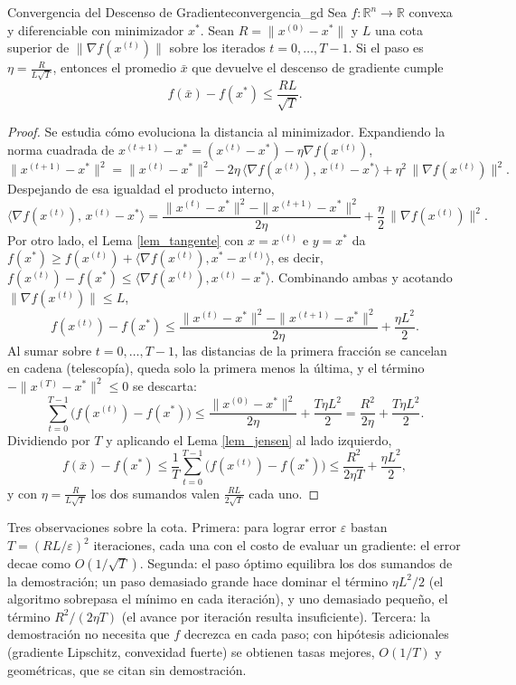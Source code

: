 \documentclass[11pt, a4paper]{article}
\begin{document}
\begin{teorema}{Convergencia del Descenso de Gradiente}{convergencia_gd}
Sea $f: \mathbb{R}^n \to \mathbb{R}$ convexa y diferenciable con minimizador $x^*$. Sean $R = \|x^{(0)} - x^*\|$ y $L$ una cota superior de $\|\nabla f(x^{(t)})\|$ sobre los iterados $t = 0, \dots, T-1$. Si el paso es $\eta = \frac{R}{L \sqrt{T}}$, entonces el promedio $\bar{x}$ que devuelve el descenso de gradiente cumple
\[
f(\bar{x}) - f(x^*) \le \frac{R L}{\sqrt{T}}.
\]
\end{teorema}

\begin{proof}
Se estudia cómo evoluciona la distancia al minimizador. Expandiendo la norma cuadrada de $x^{(t+1)} - x^* = (x^{(t)} - x^*) - \eta \nabla f(x^{(t)})$,
\[
\|x^{(t+1)} - x^*\|^2 = \|x^{(t)} - x^*\|^2 - 2 \eta \, \langle \nabla f(x^{(t)}), \, x^{(t)} - x^* \rangle + \eta^2 \, \|\nabla f(x^{(t)})\|^2.
\]
Despejando de esa igualdad el producto interno,
\[
\langle \nabla f(x^{(t)}), \, x^{(t)} - x^* \rangle
= \frac{\|x^{(t)} - x^*\|^2 - \|x^{(t+1)} - x^*\|^2}{2 \eta} + \frac{\eta}{2} \, \|\nabla f(x^{(t)})\|^2.
\]
Por otro lado, el Lema \ref{lem_tangente} con $x = x^{(t)}$ e $y = x^*$ da $f(x^*) \ge f(x^{(t)}) + \langle \nabla f(x^{(t)}), x^* - x^{(t)} \rangle$, es decir, $f(x^{(t)}) - f(x^*) \le \langle \nabla f(x^{(t)}), x^{(t)} - x^* \rangle$. Combinando ambas y acotando $\|\nabla f(x^{(t)})\| \le L$,
\[
f(x^{(t)}) - f(x^*) \le \frac{\|x^{(t)} - x^*\|^2 - \|x^{(t+1)} - x^*\|^2}{2 \eta} + \frac{\eta L^2}{2}.
\]
Al sumar sobre $t = 0, \dots, T-1$, las distancias de la primera fracción se cancelan en cadena (telescopía), queda solo la primera menos la última, y el término $-\|x^{(T)} - x^*\|^2 \le 0$ se descarta:
\[
\sum_{t=0}^{T-1} \big( f(x^{(t)}) - f(x^*) \big) \le \frac{\|x^{(0)} - x^*\|^2}{2 \eta} + \frac{T \eta L^2}{2} = \frac{R^2}{2 \eta} + \frac{T \eta L^2}{2}.
\]
Dividiendo por $T$ y aplicando el Lema \ref{lem_jensen} al lado izquierdo,
\[
f(\bar{x}) - f(x^*) \le \frac{1}{T} \sum_{t=0}^{T-1} \big( f(x^{(t)}) - f(x^*) \big) \le \frac{R^2}{2 \eta T} + \frac{\eta L^2}{2},
\]
y con $\eta = \frac{R}{L \sqrt{T}}$ los dos sumandos valen $\frac{RL}{2\sqrt{T}}$ cada uno.
\end{proof}

\obs Tres observaciones sobre la cota. Primera: para lograr error $\varepsilon$ bastan $T = (RL/\varepsilon)^2$ iteraciones, cada una con el costo de evaluar un gradiente: el error decae como $O(1/\sqrt{T})$. Segunda: el paso óptimo equilibra los dos sumandos de la demostración; un paso demasiado grande hace dominar el término $\eta L^2 / 2$ (el algoritmo sobrepasa el mínimo en cada iteración), y uno demasiado pequeño, el término $R^2 / (2\eta T)$ (el avance por iteración resulta insuficiente). Tercera: la demostración no necesita que $f$ decrezca en cada paso; con hipótesis adicionales (gradiente Lipschitz, convexidad fuerte) se obtienen tasas mejores, $O(1/T)$ y geométricas, que se citan sin demostración.
\end{document}
